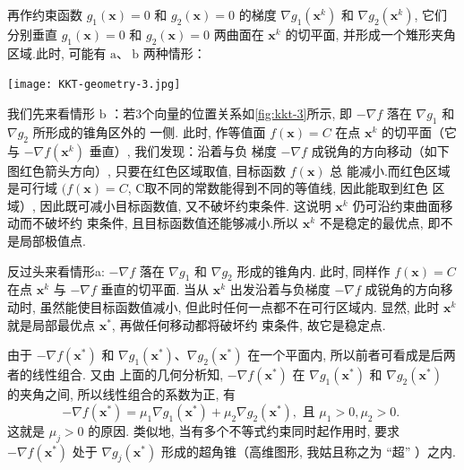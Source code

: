再作约束函数 $ g_{1}(\mathbf{x})=0 $ 和 $ g_{2}(\mathbf{x})=0 $ 的梯度 $ \nabla g_{1}\left(\mathbf{x}^{k}\right) $ 和 $ \nabla g_{2}\left(\mathbf{x}^{k}\right) $, 它们分别垂直 $ g_{1}(\mathbf{x})=0 $ 和 $ g_{2}(\mathbf{x})=0 $ 两曲面在 $ \mathbf{x}^{k} $ 的切平面, 并形成一个雉形夹角区域.此时, 可能有 $ \mathrm{a} 、 \mathrm{~b} $ 两种情形：

\begin{FigureCenter}{}
    \label{fig:kkt-3}
    \texttt{[image: KKT-geometry-3.jpg]}
\end{FigureCenter}

我们先来看情形 $\mathrm{b}$ ：若3个向量的位置关系如\ref{fig:kkt-3}所示, 即 $-\nabla f$ 落在 $\nabla g_{1}$ 和 $\nabla g_{2}$ 所形成的锥角区外的 一侧. 此时, 作等值面 $f(\mathbf{x})=C$ 在点 $\mathbf{x}^{k}$ 的切平面（它与 $-\nabla f\left(\mathbf{x}^{k}\right)$ 垂直）, 我们发现：沿着与负 梯度 $-\nabla f$ 成锐角的方向移动（如下图红色箭头方向）, 只要在红色区域取值, 目标函数 $f(\mathbf{x})$ 总 能减小.而红色区域是可行域 $(f(\mathbf{x})=C$, C取不同的常数能得到不同的等值线, 因此能取到红色 区域）, 因此既可减小目标函数值, 又不破坏约束条件. 这说明 $\mathbf{x}^{k}$ 仍可沿约束曲面移动而不破坏约 束条件, 且目标函数值还能够减小.所以 $\mathbf{x}^{k}$ 不是稳定的最优点, 即不是局部极值点.

反过头来看情形a: $ -\nabla f $ 落在 $ \nabla g_{1} $ 和 $ \nabla g_{2} $ 形成的锥角内. 此时, 同样作 $ f(\mathbf{x})=C $ 在点 $ \mathbf{x}^{k} $ 与 $ -\nabla f $ 垂直的切平面. 当从 $ \mathbf{x}^{k} $ 出发沿着与负梯度 $ -\nabla f $ 成锐角的方向移动时, 虽然能使目标函数值减小, 但此时任何一点都不在可行区域内. 显然, 此时 $ \mathbf{x}^{k} $ 就是局部最优点 $ \mathbf{x}^{*} $, 再做任何移动都将破坏约 束条件, 故它是稳定点.

由于 $ -\nabla f\left(\mathbf{x}^{*}\right) $ 和 $ \nabla g_{1}\left(\mathbf{x}^{*}\right) 、 \nabla g_{2}\left(\mathbf{x}^{*}\right) $ 在一个平面内, 所以前者可看成是后两者的线性组合. 又由 上面的几何分析知, $ -\nabla f\left(\mathbf{x}^{*}\right) $ 在 $ \nabla g_{1}\left(\mathbf{x}^{*}\right) $ 和 $ \nabla g_{2}\left(\mathbf{x}^{*}\right) $ 的夹角之间, 所以线性组合的系数为正, 有
$$
-\nabla f\left(\mathbf{x}^{*}\right)=\mu_{1} \nabla g_{1}\left(\mathbf{x}^{*}\right)+\mu_{2} \nabla g_{2}\left(\mathbf{x}^{*}\right), \text { 且 } \mu_{1}>0, \mu_{2}>0 \text {. }
$$
这就是 $ \mu_{j}>0 $ 的原因. 类似地, 当有多个不等式约束同时起作用时, 要求 $ -\nabla f\left(\mathbf{x}^{*}\right) $ 处于 $ \nabla g_{j}\left(\mathbf{x}^{*}\right) $ 形成的超角锥（高维图形, 我姑且称之为 “超” ）之内.

